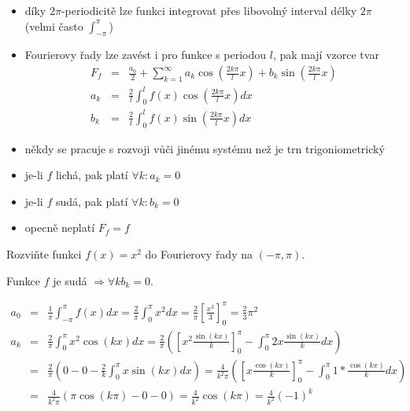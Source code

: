 \begin{poznamka}
\begin{itemize} \quad
\item díky $2 \pi$-periodicitě lze funkci integrovat přes libovolný interval délky $2 \pi$ (velmi často $\int_{-\pi}^{\pi}$)
\item Fourierovy řady lze zavést i pro funkce s periodou $l$, pak mají vzorce tvar
\begin{eqnarray}
F_f & = & \frac{a_0}{2} + \sum_{k=1}^{\infty} a_k \cos \left( \frac{2 k \pi}{l} x \right) + b_k \sin \left( \frac{2 k \pi}{l} x \right) \nonumber\\
a_k & = & \frac{2}{l} \int_0^{l} f(x) \cos \left( \frac{2 k \pi}{l} x \right) dx \nonumber\\
b_k & = & \frac{2}{l} \int_0^l f(x) \sin \left( \frac{2 k \pi}{l} x \right) dx \nonumber
\end{eqnarray}
\item někdy se pracuje s rozvoji vůči jinému systému než je trn trigoniometrický
\item je-li $f$ lichá, pak platí $\forall k : a_k = 0$
\item je-li $f$ sudá, pak platí $\forall k : b_k = 0$
\item opecně neplatí $F_f = f$
\end{itemize}
\end{poznamka}

\begin{priklad}
Rozviňte funkci $f(x) = x^2$ do Fourierovy řady na $(-\pi, \pi)$.
\end{priklad}

Funkce $f$ je sudá $\Rightarrow \forall k b_k = 0$.

\begin{eqnarray}
a_0 & = & \frac{1}{\pi} \int_{-\pi}^{\pi} f(x) dx = \frac{2}{\pi} \int_0^{\pi} x^2 dx = \frac{2}{\pi} \left[ \frac{x^3}{3} \right]_0^\pi = \frac{2}{3} \pi^2 \nonumber\\
a_k & = & \frac{2}{\pi} \int_{0}^{\pi} x^2 \cos (kx) dx = \frac{2}{\pi} \left( \left[x^2 \frac{\sin (kx)}{k} \right]_0^\pi - \int_0^\pi 2x \frac{\sin (kx)}{k} dx \right) \nonumber\\
& = & \frac{2}{\pi} \left( 0 - 0 - \frac{2}{k} \int_0^\pi x \sin (kx) dx \right) = \frac{4}{k^2 \pi} \left( \left[ x \frac{\cos (kx)}{k} \right]_0^\pi - \int_0^\pi 1 * \frac{\cos(kx)}{k} dx \right) \nonumber\\
& = & \frac{4}{k^2 \pi} \left( \pi \cos (k \pi) - 0 - 0 \right) = \frac{4}{k^2} \cos (k \pi) = \frac{4}{k^2} (-1)^k \nonumber
\end{eqnarray}


